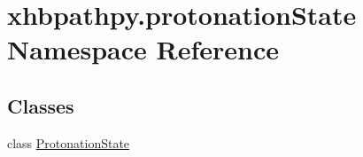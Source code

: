 \hypertarget{namespacexhbpathpy_1_1protonation_state}{\section{xhbpathpy.\-protonation\-State Namespace Reference}
\label{namespacexhbpathpy_1_1protonation_state}
}
\subsection*{Classes}
\begin{DoxyCompactItemize}
\item 
class \hyperlink{classxhbpathpy_1_1protonation_state_1_1_protonation_state}{Protonation\-State}
\end{DoxyCompactItemize}
